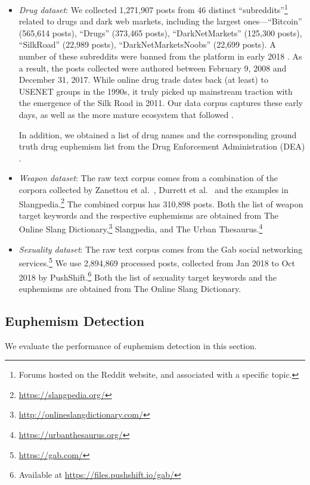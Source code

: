 \begin{itemize}%
	\item {\em Drug dataset}: We collected 1,271,907 posts from 46 distinct 
	``subreddits''\footnote{Forums hosted on the Reddit website, 
	and associated with a specific topic.} 
	related to drugs and dark web markets, 
	including the largest ones---``Bitcoin'' (565,614 posts), 
``Drugs'' (373,465 posts),
``DarkNetMarkets'' (125,300 posts),
``SilkRoad'' (22,989 posts), 
``DarkNetMarketsNoobs'' (22,699 posts). 
A number of these subreddits were banned from the platform 
in early 2018 \cite{cimpanu2018reddit}. 
As a result, the posts collected were authored between February 9, 2008 and December 31, 2017. 
While online drug trade dates back (at least) to USENET groups in the 1990s, 
it truly picked up mainstream traction with the emergence of the 
Silk Road in 2011. 
Our data corpus captures these early days, 
as well as the more mature ecosystem that followed 
\cite{soska15markets}.

	In addition, we obtained a list of drug names and the corresponding ground truth drug euphemism list from the Drug Enforcement Administration (DEA) \cite{drug2018slang}. 
	
	\item {\em Weapon dataset}: The raw text corpus comes from a combination of the 
	corpora collected by Zanettou et al.\ \cite{zannettou2018gab}, Durrett et al.\ \cite{durrett2017identifying} and the examples in Slangpedia.\footnote{\url{https://slangpedia.org/}} 
	The combined corpus has 310,898 posts. 
	Both the list of weapon target keywords and the respective euphemisms are obtained from The Online Slang Dictionary,\footnote{\url{http://onlineslangdictionary.com/}} Slangpedia, and The Urban Thesaurus.\footnote{\url{https://urbanthesaurus.org/}} 
	
	\item {\em Sexuality dataset}: The raw text corpus comes from the Gab social networking services.\footnote{\url{https://gab.com/}} We use 2,894,869 processed posts, collected from Jan 2018 to Oct 2018 by PushShift.\footnote{Available at \url{https://files.pushshift.io/gab/}} Both the list of sexuality target keywords and the euphemisms are obtained from The Online Slang Dictionary. 
\end{itemize}


\subsection{Euphemism Detection}
\label{sec:res_det}
We evaluate the performance of euphemism detection in this section. 

